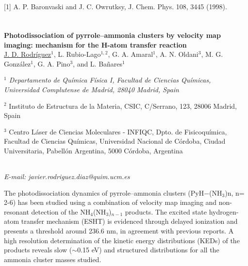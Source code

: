 \\
\vspace{0.5cm}
\\
{\footnotesize
[1] A. P. Baronvaski and J. C. Owrutksy, J. Chem. Phys. 108, 3445 (1998).
}

\newpage
\setcounter{figure}{0}
\section*{}
\begin{center}
{\bf \Large
Photodissociation of pyrrole–ammonia clusters by velocity
map imaging:
mechanism for the H-atom transfer reaction
}
\\
\vspace{0.5cm}
\underline{J. D. Rodríguez}$^{1}$, L. Rubio-Lago$^{1,2}$, G. A. Amaral$^{1}$, A. N. Oldani$^{3}$,
M. G. González$^{1}$, G. A. Pino$^{3}$, and L. Bañares$^{1}$
\\
\vspace{0.5cm}
{\it
$^{1}$ Departamento de Química Física I, Facultad de Ciencias Químicas,
Universidad Complutense de Madrid, 28040 Madrid, Spain

$^{2}$ Instituto de Estructura de la Materia, CSIC, C/Serrano, 123,
28006 Madrid, Spain

$^{3}$ Centro Láser de Ciencias Moleculares - INFIQC, Dpto. de
Fisicoquímica, Facultad de Ciencias Químicas, Universidad Nacional
de Córdoba, Ciudad Universitaria, Pabellón Argentina, 5000
Córdoba, Argentina
}
\\
\vspace{0.5cm}
{\it E-mail: javier.rodriguez.diaz@quim.ucm.es}
\vspace{0.5cm}
\end{center}
The photodissociation dynamics of pyrrole–ammonia clusters (PyH$-$(NH$_{3}$)n, n= 2-6)
has been studied using a combination of velocity map imaging and non-resonant
detection of the NH$_{4}$(NH$_{3}$)$_{n-1}$ products. The excited state hydrogen-atom transfer
mechanism (ESHT) is evidenced through delayed ionization and presents a threshold
around 236.6 nm, in agreement with previous reports. A high resolution
determination of the kinetic energy distributions (KEDs) of the products reveals slow
($\sim$0.15 eV) and structured distributions for all the ammonia cluster masses studied.
